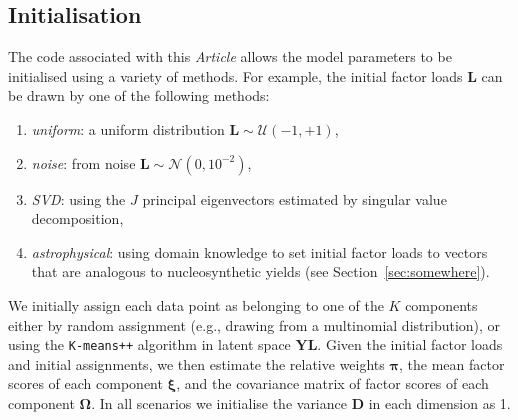 \documentclass[twocolumn]{aastex61}
\newcommand{\todo}[1]{\textcolor{red}{#1}}
\newcommand{\vect}[1]{\boldsymbol{\mathbf{#1}}}
\renewcommand{\vec}[1]{\vect{#1}}
\newcommand{\data}{\textbf{Y}}
\newcommand{\vecdata}{\vec\data}
\newcommand{\factorloads}{\textbf{L}}
\newcommand{\factorscores}{\textbf{S}}
\newcommand{\specificvariance}{\vec{D}}
\newcommand{\scoremeans}{\vec\xi}
\newcommand{\scorecovs}{\vec\Omega}
\newcommand{\NumLatentFactors}{J}
\newcommand{\NumComponents}{K}
\begin{document}



\subsection{Initialisation}

The code associated with this \emph{Article} allows the model parameters
to be initialised using a variety of methods. For example, the initial factor 
loads $\factorloads$ can be drawn by one of the following methods:
\begin{enumerate}
	\item \emph{uniform}: a uniform distribution $\factorloads \sim \mathcal{U}\left(-1, +1\right)$,
	\item \emph{noise}: from noise $\factorloads \sim \mathcal{N}\left(0, 10^{-2}\right)$,
	\item \emph{SVD}: using the $\NumLatentFactors$ principal eigenvectors estimated by singular value decomposition,
	\item \emph{astrophysical}: using domain knowledge to set initial factor loads to vectors that are analogous to nucleosynthetic yields (see Section~\todo{\ref{sec:somewhere}}).
\end{enumerate}

We initially assign each data point as belonging to one of the $\NumComponents$
components either by random assignment (e.g., drawing from a multinomial distribution), 
or using the \texttt{K-means++} algorithm \citep{LLoyd} in latent space $\vecdata\factorloads$.
Given the initial factor loads and initial assignments, we then estimate the relative weights
$\vec\pi$, the mean factor scores of each component $\scoremeans$, and the covariance matrix
of factor scores of each component $\scorecovs$. In all scenarios we initialise the 
variance $\specificvariance$ in each dimension as 1.
\end{document}
